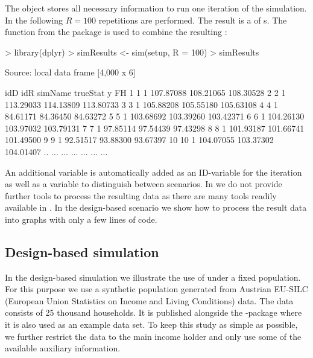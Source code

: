 \documentclass[article]{ajs}
\begin{document}
The object  stores all necessary information to run one iteration of the simulation. In the following $R = 100$ repetitions are performed. The result is a  of s. The function  from the package  is used to combine the resulting :

\begin{Schunk}
\begin{Sinput}
> library(dplyr)
> simResults <- sim(setup, R = 100) %
> simResults %
\end{Sinput}
\begin{Soutput}
Source: local data frame [4,000 x 6]

   idD idR simName  trueStat         y        FH
1    1   1         107.87088 108.21065 108.30528
2    2   1         113.29033 114.13809 113.80733
3    3   1         105.88208 105.55180 105.63108
4    4   1          84.61171  84.36450  84.63272
5    5   1         103.68692 103.39260 103.42371
6    6   1         104.26130 103.97032 103.79131
7    7   1          97.85114  97.54439  97.43298
8    8   1         101.93187 101.66741 101.49500
9    9   1          92.51517  93.88300  93.67397
10  10   1         104.07055 103.37302 104.01407
.. ... ...     ...       ...       ...       ...
\end{Soutput}
\end{Schunk}

An additional variable  is automatically added as an ID-variable for the iteration as well as a variable  to distinguish between scenarios. In  we do not provide further tools to process the resulting data as there are many tools readily available in . In the design-based scenario we show how to process the result data into graphs with only a few lines of code.

\subsection{Design-based simulation}
\label{sec:csDesign}

In the design-based simulation we illustrate the use of  under a fixed population. For this purpose we use a synthetic population generated from Austrian EU-SILC (European Union Statistics on Income and Living Conditions) data. The data consists of 25 thousand households. It is published alongside the -package  \citep{Alf10} where it is also used as an example data set. To keep this study as simple as possible, we further restrict the data to the main income holder and only use some of the available auxiliary information.
\end{document}
